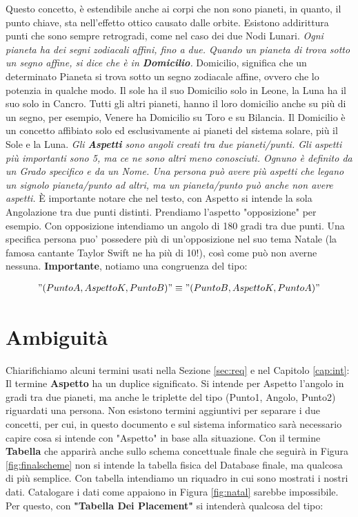 Questo concetto, è estendibile anche ai corpi che non sono pianeti, in quanto, il punto chiave, sta nell'effetto ottico causato dalle orbite. Esistono addirittura punti che sono sempre retrogradi, come nel caso dei due Nodi Lunari.
\newpage
\mline
\textit{
  Ogni pianeta ha dei segni zodiacali affini, fino a due. Quando un pianeta di trova sotto un segno affine, si dice che è in \textbf{Domicilio}.
}
\mline
Domicilio, significa che un determinato Pianeta si trova sotto un segno zodiacale affine, ovvero che lo potenzia in qualche modo. Il sole ha il suo Domicilio solo in Leone, la Luna ha il suo solo in Cancro. Tutti gli altri pianeti, hanno il loro domicilio anche su più di un segno, per esempio, Venere ha Domicilio su Toro e su Bilancia.\newline
Il Domicilio è un concetto affibiato solo ed esclusivamente ai pianeti del sistema solare, più il Sole e la Luna.
\mline
\textit{
  Gli \textbf{Aspetti} sono angoli creati tra due pianeti/punti. Gli aspetti più importanti sono 5, ma ce ne sono altri meno conosciuti. Ognuno è definito da un Grado specifico e da un Nome. Una persona può avere più aspetti che legano un signolo pianeta/punto ad altri, ma un pianeta/punto può anche non avere aspetti.
}
\mline
È importante notare che nel testo, con Aspetto si intende la sola Angolazione tra due punti distinti. Prendiamo l'aspetto "opposizione" per esempio. Con opposizione intendiamo un angolo di 180 gradi tra due punti. Una specifica persona puo' possedere più di un'opposizione nel suo tema Natale (la famosa cantante Taylor Swift ne ha più di 10!), così come può non averne nessuna.\newline
\textbf{Importante}, notiamo una congruenza del tipo:\newline

\begin{align}
  "(Punto A, Aspetto K, Punto B)" \equiv "(Punto B, Aspetto K, Punto A)"
\end{align}
\newpage
\section{Ambiguità}

Chiarifichiamo alcuni termini usati nella Sezione \ref{sec:req} e nel Capitolo \ref{cap:int}:\newline
Il termine \textbf{Aspetto} ha un duplice significato. Si intende per Aspetto l'angolo in gradi tra due pianeti, ma anche le triplette del tipo (Punto1, Angolo, Punto2) riguardati una persona.\newline
Non esistono termini aggiuntivi per separare i due concetti, per cui, in questo documento e sul sistema informatico sarà necessario capire cosa si intende con "Aspetto" in base alla situazione.\newline
Con il termine \textbf{Tabella} che apparirà anche sullo schema concettuale finale che seguirà in Figura \ref{fig:finalscheme} non si intende la tabella fisica del Database finale, ma qualcosa di più semplice. Con tabella intendiamo un riquadro in cui sono mostrati i nostri dati. Catalogare i dati come appaiono in Figura \ref{fig:natal} sarebbe impossibile. Per questo, con \textbf{"Tabella Dei Placement"} si intenderà qualcosa del tipo:

